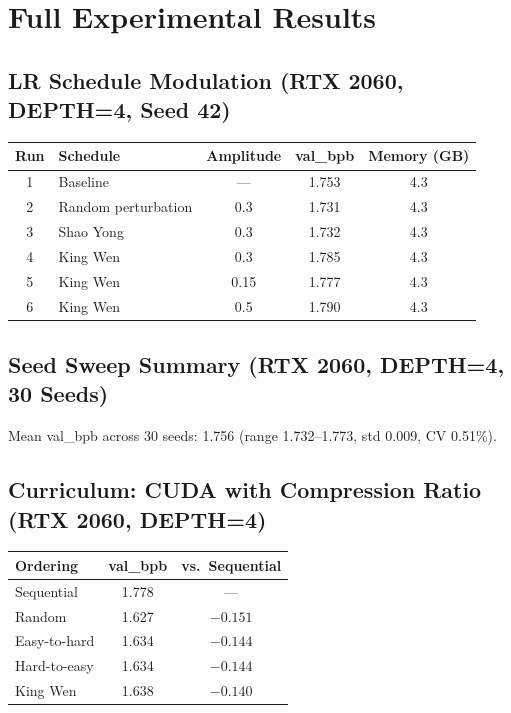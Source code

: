 \documentclass{article}
\begin{document}
\appendix
\section{Full Experimental Results}\label{app:results}

\subsection{LR Schedule Modulation (RTX 2060, DEPTH=4, Seed 42)}

\begin{table}[h]
\centering
\begin{tabular}{clccc}
\toprule
\textbf{Run} & \textbf{Schedule} & \textbf{Amplitude} & \textbf{val\_bpb} & \textbf{Memory (GB)} \\
\midrule
1 & Baseline & --- & 1.753 & 4.3 \\
2 & Random perturbation & 0.3 & 1.731 & 4.3 \\
3 & Shao Yong & 0.3 & 1.732 & 4.3 \\
4 & King Wen & 0.3 & 1.785 & 4.3 \\
5 & King Wen & 0.15 & 1.777 & 4.3 \\
6 & King Wen & 0.5 & 1.790 & 4.3 \\
\bottomrule
\end{tabular}
\end{table}

\subsection{Seed Sweep Summary (RTX 2060, DEPTH=4, 30 Seeds)}

Mean val\_bpb across 30 seeds: 1.756 (range 1.732--1.773, std 0.009, CV 0.51\%).

\subsection{Curriculum: CUDA with Compression Ratio (RTX 2060, DEPTH=4)}

\begin{table}[h]
\centering
\begin{tabular}{lcc}
\toprule
\textbf{Ordering} & \textbf{val\_bpb} & \textbf{vs.\ Sequential} \\
\midrule
Sequential & 1.778 & --- \\
Random & 1.627 & $-0.151$ \\
Easy-to-hard & 1.634 & $-0.144$ \\
Hard-to-easy & 1.634 & $-0.144$ \\
King Wen & 1.638 & $-0.140$ \\
\bottomrule
\end{tabular}
\end{table}
\end{document}
